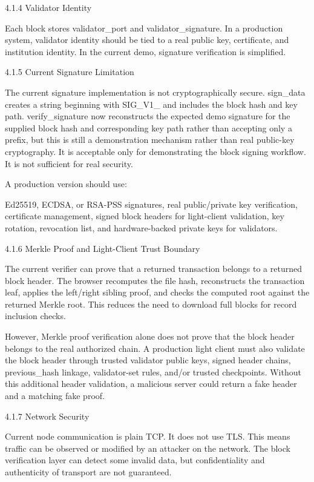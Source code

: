 \documentclass[12pt]{article}
\begin{document}
4.1.4 Validator Identity

Each block stores validator\_port and validator\_signature. In a production system, validator identity should be tied to a real public key, certificate, and institution identity. In the current demo, signature verification is simplified.

4.1.5 Current Signature Limitation

The current signature implementation is not cryptographically secure. sign\_data creates a string beginning with SIG\_V1\_ and includes the block hash and key path. verify\_signature now reconstructs the expected demo signature for the supplied block hash and corresponding key path rather than accepting only a prefix, but this is still a demonstration mechanism rather than real public-key cryptography. It is acceptable only for demonstrating the block signing workflow. It is not sufficient for real security.

A production version should use:

 Ed25519, ECDSA, or RSA-PSS signatures, real public/private key verification, certificate management, signed block headers for light-client validation, key rotation, revocation list, and hardware-backed private keys for validators.

4.1.6 Merkle Proof and Light-Client Trust Boundary

The current verifier can prove that a returned transaction belongs to a returned block header. The browser recomputes the file hash, reconstructs the transaction leaf, applies the left/right sibling proof, and checks the computed root against the returned Merkle root. This reduces the need to download full blocks for record inclusion checks.

However, Merkle proof verification alone does not prove that the block header belongs to the real authorized chain. A production light client must also validate the block header through trusted validator public keys, signed header chains, previous\_hash linkage, validator-set rules, and/or trusted checkpoints. Without this additional header validation, a malicious server could return a fake header and a matching fake proof.

4.1.7 Network Security

Current node communication is plain TCP. It does not use TLS. This means traffic can be observed or modified by an attacker on the network. The block verification layer can detect some invalid data, but confidentiality and authenticity of transport are not guaranteed.
\end{document}
